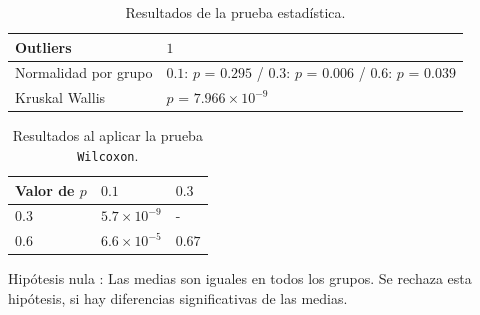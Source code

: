 \documentclass{article}
\begin{document}
\begin{table}[h!]
\centering
\caption{Resultados de la prueba estadística.}
\smallskip

\begin{tabular}{ |p{4cm}|p{8cm}|}
 \hline
 Outliers & $1$ \\
 \hline
 Normalidad por grupo & $0.1$: $p$ = $0.295$ / $0.3$: $p$ = $0.006$ / $0.6$: $p$ = $0.039$ \\
 \hline
 Kruskal Wallis & $p$ = $7.966\times 10^{-9}$ \\
 \hline
\end{tabular}
\label{Cuadro7}
\end{table}

\begin{table}[h!]
\centering
\caption{Resultados al aplicar la prueba \texttt{Wilcoxon}.}
\smallskip

\begin{tabular}{|p{1.7cm}|p{1.7cm}|p{1.7cm}|}
 \hline
Valor de $p$ & $0.1$ & $0.3$ \\
 \hline
 $0.3$ & $5.7\times 10^{-9}$ & -   \\
 \hline
 $0.6$ & $6.6\times 10^{-5}$ & $0.67$  \\
 \hline
\end{tabular}
\label{Cuadro8}
\end{table}

Hipótesis nula : Las medias son iguales en todos los grupos. Se rechaza esta hipótesis, si hay diferencias significativas de las medias.
\end{document}
